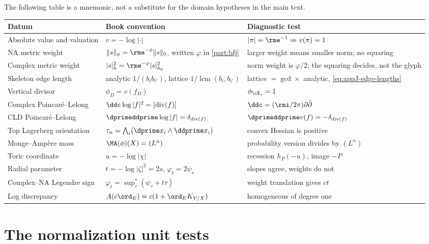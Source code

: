 The following table is a mnemonic, not a substitute for the domain
hypotheses in the main text.
\begin{center}
\small
\begin{tabular}{@{}p{}p{}p{}@{}}
\toprule
Datum & Book convention & Diagnostic test \\
\midrule
Absolute value and valuation
 & \(v=-\log|\cdot|\)
 & \(|\pi|=\rme^{-1}\Rightarrow v(\pi)=1\) \\
NA metric weight
 & \(\|s\|_\phi=\rme^{-\phi}\|s\|_0\), written \(\varphi\) in \cref{part:bfj}
 & larger weight means smaller norm; no squaring \\
Complex metric weight
 & \(|s|_h^2=\rme^{-\varphi}|s|_{h_0}^2\)
 & norm weight is \(\varphi/2\); the squaring decides, not the glyph \\
Skeleton edge length
 & analytic \(1/(b_ib_{i'})\), lattice \(1/\operatorname{lcm}(b_i,b_{i'})\)
 & lattice \(=\gcd\times\) analytic, \eqref{eq:appJ-edge-lengths} \\
Vertical divisor
 & \(\phi_D=v(f_D)\)
 & \(\phi_{\cX_s}=1\) \\
Complex Poincar\'e--Lelong
 & \(\ddc\log|f|^2=[\operatorname{div}(f)]\)
 & \(\ddc=(\rmi/2\pi)\partial\bar\partial\) \\
CLD Poincar\'e--Lelong
 & \(\dprimeddprime\log|f|=\delta_{\operatorname{div}(f)}\)
 & \(\dprimeddprime v(f)=-\delta_{\operatorname{div}(f)}\) \\
Top Lagerberg orientation
 & \(\tau_n=\bigwedge_i(\dprime x_i\wedge\ddprime x_i)\)
 & convex Hessian is positive \\
Monge--Amp\`ere mass
 & \(\MA(\phi)(X)=(L^n)\)
 & probability version divides by \((L^n)\) \\
Toric coordinate
 & \(u=-\log|\chi|\)
 & recession \(h_P(-u)\), image \(-P\) \\
Radial parameter
 & \(t=-\log|\zeta|^2=2s\), \(\varphi_t=2\psi_s\)
 & slopes agree, weights do not \\
Complex--NA Legendre sign
 & \(\varphi_t=\sup_\tau^*(\psi_\tau+t\tau)\)
 & weight translation gives \(ct\) \\
Log discrepancy
 & \(A(c\ord_E)=c(1+\ord_EK_{Y/X})\)
 & homogeneous of degree one \\
\bottomrule
\end{tabular}
\end{center}

\section{The normalization unit tests}
\label{sec:appJ-unit-tests}

